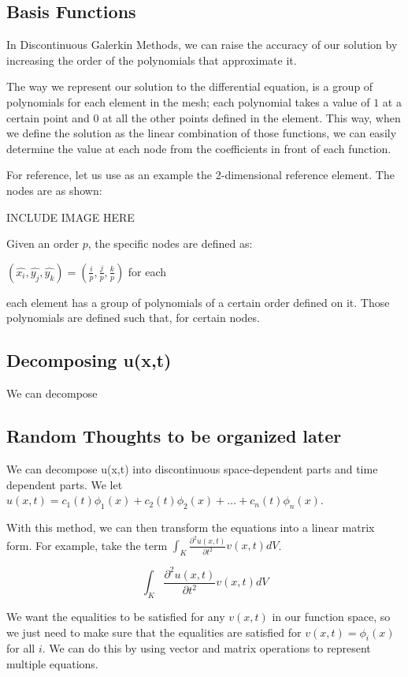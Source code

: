 \subsection{Basis Functions}

In Discontinuous Galerkin Methods, we can raise the accuracy of our solution by increasing the order of the polynomials that approximate it. 

The way we represent our solution to the differential equation, is a group of polynomials for each element in the mesh; each polynomial takes a value of $1$ at a certain point and $0$ at all the other points defined in the element. This way, when we define the solution as the linear combination of those functions, we can easily determine the value at each node from the coefficients in front of each function.

For reference, let us use as an example the 2-dimensional reference element. The nodes are as shown:




INCLUDE IMAGE HERE


Given an order $p$, the specific nodes are defined as:

$(\hat{x_i}, \hat{y_j}, \hat{y_k}) = \left( \frac{i}{p}, \frac{j}{p}, \frac{k}{p} \right)$ for each 

each element has a group of polynomials of a certain order defined on it. Those polynomials are defined such that, for certain nodes.


\subsection{Decomposing u(x,t)}

We can decompose 

\subsection{Random Thoughts to be organized later}

We can decompose u(x,t) into discontinuous space-dependent parts and time dependent parts. We let $u(x,t) = c_1(t) \phi_1(x) + c_2(t) \phi_2(x) + \ldots + c_n(t) \phi_n(x)$. 

With this method, we can then transform the equations into a linear matrix form. For example, take the term $\int_K \frac{\partial^2 u(x,t)}{\partial t^2} v(x,t) dV$.

$$\int_K \frac{\partial^2 u(x,t)}{\partial t^2} v(x,t) dV$$

We want the equalities to be satisfied for any $v(x,t)$ in our function space, so we just need to make sure that the equalities are satisfied for $v(x,t) = \phi_i(x)$ for all $i$. We can do this by using vector and matrix operations to represent multiple equations.


